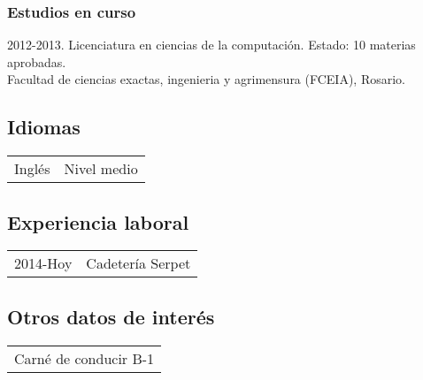 \documentclass[12pt]{article}
\begin{document}
\subsubsection*{Estudios en curso}
\normalsize{2012-2013. Licenciatura en ciencias de la computación. Estado: 10 materias aprobadas.}\\
\small{Facultad de ciencias exactas, ingenieria y agrimensura (FCEIA), Rosario.}
\subsection*{Idiomas}
\begin{tabular}{l l}
  Inglés&Nivel medio\\
\end{tabular}
\subsection*{Experiencia laboral}
\begin{tabular}{l l}
  2014-Hoy&Cadetería Serpet\\
\end{tabular}
\subsection*{Otros datos de interés}
\begin{tabular}{l}
  Carné de conducir B-1\\
\end{tabular}
\end{document}

